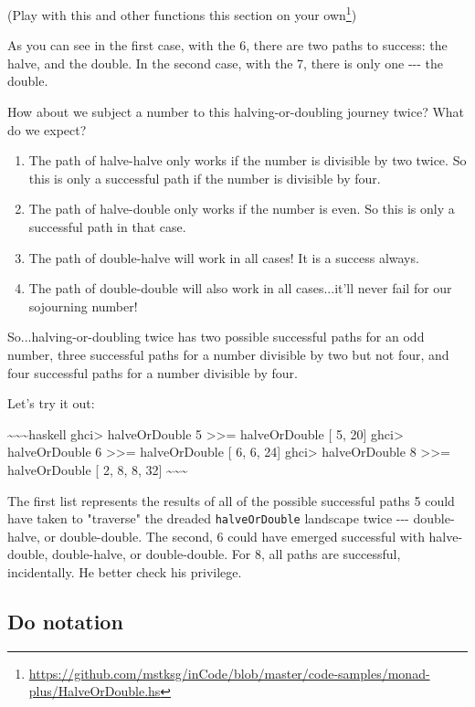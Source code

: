 \documentclass[]{article}
\renewcommand{\href}[2]{#2\footnote{\url{#1}}}
\begin{document}
(\href{https://github.com/mstksg/inCode/blob/master/code-samples/monad-plus/HalveOrDouble.hs}{Play
with this and other functions this section on your own})

As you can see in the first case, with the 6, there are two paths to success:
the halve, and the double. In the second case, with the 7, there is only one
-\/-\/- the double.

How about we subject a number to this halving-or-doubling journey twice? What do
we expect?

\begin{enumerate}
\tightlist
\item
  The path of halve-halve only works if the number is divisible by two twice. So
  this is only a successful path if the number is divisible by four.
\item
  The path of halve-double only works if the number is even. So this is only a
  successful path in that case.
\item
  The path of double-halve will work in all cases! It is a success always.
\item
  The path of double-double will also work in all cases...it'll never fail for
  our sojourning number!
\end{enumerate}

So...halving-or-doubling twice has two possible successful paths for an odd
number, three successful paths for a number divisible by two but not four, and
four successful paths for a number divisible by four.

Let's try it out:

\textasciitilde{}\textasciitilde{}\textasciitilde{}haskell ghci\textgreater{}
halveOrDouble 5 \textgreater{}\textgreater{}= halveOrDouble {[} 5, 20{]}
ghci\textgreater{} halveOrDouble 6 \textgreater{}\textgreater{}= halveOrDouble
{[} 6, 6, 24{]} ghci\textgreater{} halveOrDouble 8 \textgreater{}\textgreater{}=
halveOrDouble {[} 2, 8, 8, 32{]}
\textasciitilde{}\textasciitilde{}\textasciitilde{}

The first list represents the results of all of the possible successful paths 5
could have taken to "traverse" the dreaded \texttt{halveOrDouble} landscape
twice -\/-\/- double-halve, or double-double. The second, 6 could have emerged
successful with halve-double, double-halve, or double-double. For 8, all paths
are successful, incidentally. He better check his privilege.

\subsection{Do notation}
\end{document}
